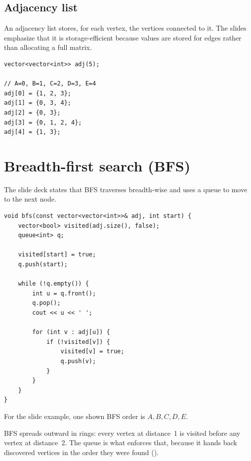 \subsection{Adjacency list}

An adjacency list stores, for each vertex, the vertices connected to it. The slides emphasize that it is storage-efficient because values are stored for edges rather than allocating a full matrix.

\begin{lstlisting}
vector<vector<int>> adj(5);

// A=0, B=1, C=2, D=3, E=4
adj[0] = {1, 2, 3};
adj[1] = {0, 3, 4};
adj[2] = {0, 3};
adj[3] = {0, 1, 2, 4};
adj[4] = {1, 3};
\end{lstlisting}

\section{Breadth-first search (BFS)}

The slide deck states that BFS traverses breadth-wise and uses a queue to move to the next node.

\begin{lstlisting}
void bfs(const vector<vector<int>>& adj, int start) {
    vector<bool> visited(adj.size(), false);
    queue<int> q;

    visited[start] = true;
    q.push(start);

    while (!q.empty()) {
        int u = q.front();
        q.pop();
        cout << u << ' ';

        for (int v : adj[u]) {
            if (!visited[v]) {
                visited[v] = true;
                q.push(v);
            }
        }
    }
}
\end{lstlisting}

For the slide example, one shown BFS order is $A,B,C,D,E$.

BFS spreads outward in rings: every vertex at distance~1 is visited before any vertex at
distance~2. The queue is what enforces that, because it hands back discovered vertices in
the order they were found ().

